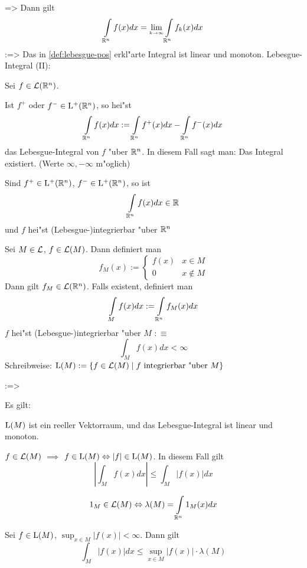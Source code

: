   =>{
  Dann gilt
  \[\int_{\SetR^n} f(x)dx=\limes k->\infty \int_{\SetR^n} f_k(x)dx
    \]
}
\theorem:=>{
  Das in \ref{def:lebesgue-pos} erkl"arte Integral ist linear und monoton.
  }
 Lebesgue-Integral (II):{
  Sei $f\in\mathcal{L}(\mathbb R^n)$.
  \begin{stmts}
    \item Ist $f^+$ oder $f^-\in{\rm L}^+(\mathbb R^n)$, so hei"st
      \[\int_{\SetR^n} f(x)dx:=\int_{\SetR^n} f^+(x)dx-\int_{\SetR^n} f^-(x)dx
        \]
      das Lebesgue-Integral von $f$ "uber $\mathbb R^n$.
      In diesem Fall sagt man: Das Integral existiert. 
      (Werte $\infty,-\infty$ m"oglich)
    \item
      Sind $f^+\in{\rm L}^+(\mathbb R^n)$, $f^-\in{\rm L}^+(\mathbb R^n)$, so ist
      \[\int_{\SetR^n} f(x)dx\in\SetR
        \]
      und $f$ hei"st (Lebesgue-)integrierbar "uber $\mathbb R^n$
    \item Sei $M\in\mathcal{L}$, $f\in\mathcal{L}(M)$. Dann definiert man
      \[f_M(x):=\begin{cases} f(x) & x\in M \\ 0 & x\not\in M \end{cases}
        \]
      Dann gilt $f_M\in\mathcal{L}(\mathbb R^n)$. Falls existent, definiert man
      \[\int_M f(x) dx:=\int_{\SetR^n} f_M(x) dx
        \]
      $f$ hei"st (Lebesgue-)integrierbar "uber $M$ $:\equiv$
      \[\int_M f(x)dx<\infty
        \]
      Schreibweise: ${\rm L}(M):=\{f\in\mathcal{L}(M)\mid 
        f \text{ integrierbar "uber $M$} \}$
    \end{stmts}
  }
\theorem:=>{
  Es gilt:
  \begin{stmts}
    \item ${\rm L}(M)$ ist ein reeller Vektorraum, und das Lebesgue-Integral
      ist linear und monoton.
    \item $f\in\mathcal{L}(M)$ $\implies$ 
      $f\in{\rm L}(M)\Leftrightarrow|f|\in{\rm L}(M)$. In diesem Fall gilt
      \[\left|\int_M f(x) dx\right|\le\int_M |f(x)| dx
        \]
    \item 
      \[1_M\in\SetFLMeas(M) \equiv \lambda(M)=\int_{\SetR^n} 1_M(x) dx
        \]
    \item Sei $f\in{\rm L}(M)$, $\sup_{x\in M}|f(x)|<\infty$. Dann gilt
      \[\int_M |f(x)| dx \le \sup_{x\in M} |f(x)|\cdot \lambda(M)
        \]
  \end{stmts}
  }
